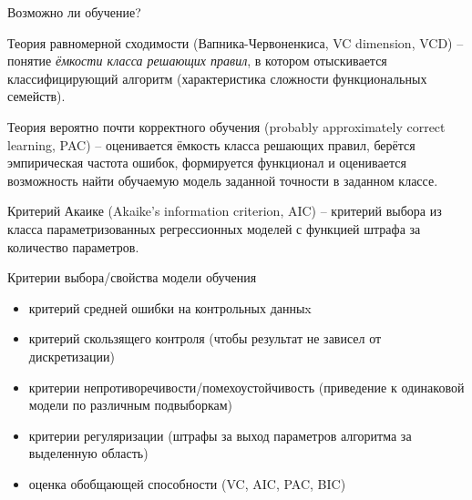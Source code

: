 \documentclass[pdf, intlimits, 9pt, unicode]{beamer}
\begin{document}
\begin{frame}{Возможно ли обучение?}

{\color{red}Теория равномерной сходимости} (Вапника-Червоненкиса, VC dimension, VCD) -- понятие \emph{ёмкости класса решающих правил}, в котором отыскивается классифицирующий алгоритм (характеристика сложности функциональных семейств).\pause 


{\color{red}Теория вероятно почти корректного обучения} (probably approximately correct learning, PAC) -- оценивается ёмкость класса решающих правил, берётся эмпирическая частота ошибок, формируется функционал и оценивается возможность найти обучаемую модель заданной точности в заданном классе.\pause 


{\color{red}Критерий Акаике} (Akaike's information criterion, AIC) -- критерий выбора из класса параметризованных регрессионных моделей с функцией штрафа за количество параметров.

\end{frame}





\begin{frame}{Критерии выбора/свойства модели обучения}
\begin{itemize}
\item критерий средней ошибки на контрольных данныx\pause 
\item критерий скользящего контроля (чтобы результат не зависел от дискретизации)\pause 
\item критерии непротиворечивости/помехоустойчивость (приведение к одинаковой модели по различным подвыборкам)\pause 
\item критерии регуляризации (штрафы за выход параметров алгоритма за выделенную область)\pause 
\item оценка обобщающей способности (VC, AIC, PAC, BIC)
\end{itemize}
\end{frame}
\end{document}
